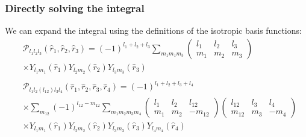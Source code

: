 \documentclass{beamer}
\begin{document}
    \begin{frame}
        \frametitle{Directly solving the integral}
        We can expand the integral using the definitions of the isotropic basis functions:
        \begin{align*}
            &\mathcal P_{l_1 l_2 l_3}(\hat r_1, \hat r_2, \hat r_3) = (-1)^{l_1+l_2+l_3} \sum_{m_1 m_1 m_3} 
            \begin{pmatrix}
            l_1 & l_2 & l_3\\
            m_1 & m_2 & m_3
            \end{pmatrix}\\
            &\times
            Y_{l_1 m_1}(\hat r_1)Y_{l_2 m_2}(\hat r_2)Y_{l_3 m_3}(\hat r_3)\\ &\\
            &\mathcal P_{l_1 l_2 (l_{12}) l_3 l_4}(\hat r_1, \hat r_2, \hat r_3, \hat r_4) = (-1)^{l_1+l_2+l_3+l_4}\\
            &\times \sum_{m_{12}} (-1)^{l_{12}-m_{12}}
            \sum_{m_1 m_2 m_3 m_4}
            \begin{pmatrix}
                l_1 & l_2 & l_{12}\\
                m_1 & m_2 & -m_{12}
            \end{pmatrix}
            \begin{pmatrix}
                l_{12} & l_3 & l_4\\
                m_{12} & m_3 & -m_4
            \end{pmatrix}\\
            &\times
            Y_{l_1 m_1}(\hat r_1)Y_{l_2 m_2}(\hat r_2)Y_{l_3 m_3}(\hat r_3)Y_{l_4 m_4}(\hat r_4)
        \end{align*}
    \end{frame}
\end{document}
